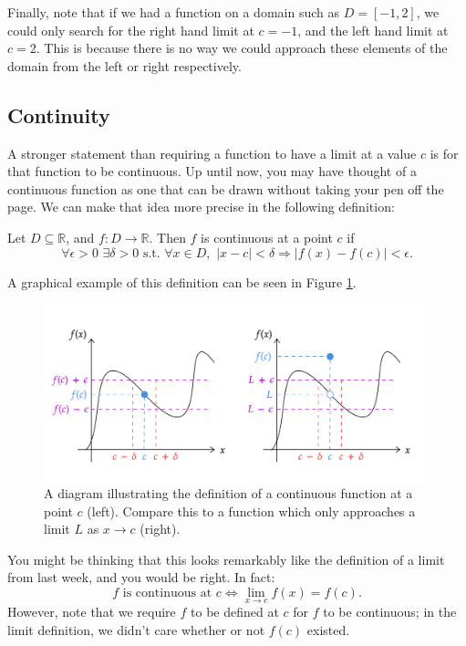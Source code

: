 \documentclass[
  17pt,
  a4paper]{extarticle}
\theoremstyle{plain}
\theoremstyle{definition}
\theoremstyle{plain}
\theoremstyle{plain}
\theoremstyle{plain}
\theoremstyle{plain}
\theoremstyle{definition}
\theoremstyle{definition}
\theoremstyle{remark}
\theoremstyle{remark}
\let\BeginKnitrBlock\begin \let\EndKnitrBlock\end
\renewcommand{\;}{\,}
\begin{document}
Finally, note that if we had a function on a domain such as \(D = [-1,2]\), we could only search for the right hand limit at \(c = -1\), and the left hand limit at \(c = 2\). This is because there is no way we could approach these elements of the domain from the left or right respectively.

\hypertarget{continuity}{%
\subsection{Continuity}\label{continuity}}

A stronger statement than requiring a function to have a limit at a value \(c\) is for that function to be continuous. Up until now, you may have thought of a continuous function as one that can be drawn without taking your pen off the page. We can make that idea more precise in the following definition:

\BeginKnitrBlock{definition}[Continuity]
{\label{def:def2} }Let \(D \subseteq \mathbb{R}\), and \(f: D \to \mathbb{R}\). Then \(f\) is continuous at a point \(c\) if \[\forall \epsilon > 0\;\;\exists \delta > 0\;\;\text{s.t.}\;\;\forall x \in D,\;\; \lvert x - c \rvert < \delta \Rightarrow \lvert f(x) - f(c) \rvert < \epsilon.\]
\EndKnitrBlock{definition}

A graphical example of this definition can be seen in Figure \ref{fig:cont}.

\begin{figure}
\includegraphics[width=\Width,height=\Height]{Continuity} \caption{A diagram illustrating the definition of a continuous function at a point $c$ (left). Compare this to a function which only approaches a limit $L$ as $x \to c$ (right).}\label{fig:cont}
\end{figure}

You might be thinking that this looks remarkably like the definition of a limit from last week, and you would be right. In fact: \[f\;\;\text{is continuous at}\;\; c \Longleftrightarrow \lim_{x \to c}f(x) = f(c).\] However, note that we require \(f\) to be defined at \(c\) for \(f\) to be continuous; in the limit definition, we didn't care whether or not \(f(c)\) existed.
\end{document}
